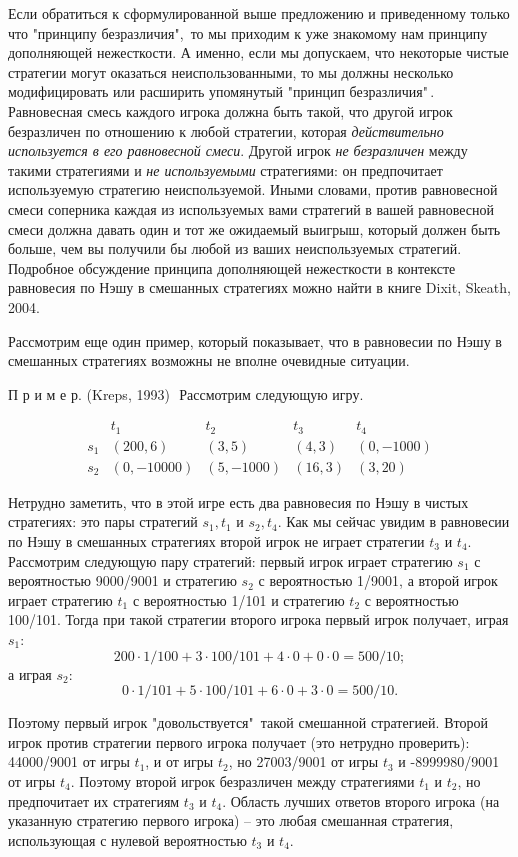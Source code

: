 {Если обратиться к сформулированной выше предложению и приведенному
только что "принципу безразличия",\, то мы приходим к уже знакомому нам
принципу дополняющей нежесткости. А именно, если мы допускаем, что
некоторые чистые стратегии могут оказаться неиспользованными, то мы
должны несколько модифицировать или расширить упомянутый "принцип
безразличия"\,. Равновесная смесь каждого игрока должна быть такой,
что другой игрок безразличен по отношению к любой стратегии, которая
\emph{действительно используется в его равновесной смеси}. Другой игрок
\emph{не безразличен} между такими стратегиями и \emph{не используемыми}
стратегиями: он предпочитает используемую стратегию неиспользуемой.
Иными словами, против равновесной смеси соперника каждая из используемых
вами стратегий в вашей равновесной смеси должна давать один и тот же
ожидаемый выигрыш, который должен быть больше, чем вы получили бы любой
из ваших неиспользуемых стратегий. Подробное обсуждение принципа
дополняющей нежесткости в контексте равновесия по Нэшу в смешанных
стратегиях можно найти в книге Dixit, Skeath, 2004.

Рассмотрим еще один пример, который показывает, что в равновесии по
Нэшу в смешанных стратегиях возможны не вполне очевидные ситуации.

П р и м е р. (Kreps, 1993)\,\, Рассмотрим следующую игру.

$$\begin{array}{rcccl}
&t_1&t_2&t_3&t_4\\
s_1&(200,6)&(3,5)&(4,3)&(0,-1000)\\
s_2&(0,-10000)&(5,-1000)&(16,3)&(3,20)
\end{array}$$

Нетрудно заметить, что в этой игре есть два равновесия по Нэшу в
чистых стратегиях: это пары стратегий $s_1, t_1$  и $s_2, t_4$. Как
мы сейчас увидим в равновесии по Нэшу в смешанных стратегиях второй
игрок не играет стратегии $t_3$ и $t_4$. Рассмотрим следующую пару
стратегий: первый игрок играет стратегию $s_1$ с вероятностью
9000/9001 и стратегию $s_2$ с вероятностью 1/9001, а второй игрок
играет стратегию  $t_1$ с вероятностью 1/101 и стратегию $t_2$ с
вероятностью 100/101. Тогда при такой стратегии второго игрока
первый игрок получает, играя $s_1$:
$$200\cdot1/100+3\cdot100/101+4\cdot0+0\cdot0=500/10;$$
а играя $s_2$:
$$0\cdot1/101+5\cdot100/101+6\cdot0+3\cdot0=500/10.$$

Поэтому первый игрок "довольствуется"\, такой смешанной стратегией.
Второй игрок против стратегии первого игрока получает (это нетрудно
проверить): 44000/9001 от игры $t_1$, и от игры $t_2$, но 27003/9001
от игры $t_3$ и -8999980/9001 от игры $t_4$. Поэтому второй игрок
безразличен между стратегиями $t_1$ и $t_2$, но предпочитает их
стратегиям $t_3$ и $t_4$. Область лучших ответов второго игрока (на
указанную стратегию первого игрока) -- это любая смешанная
стратегия, использующая с нулевой вероятностью $t_3$ и $t_4$.

}
